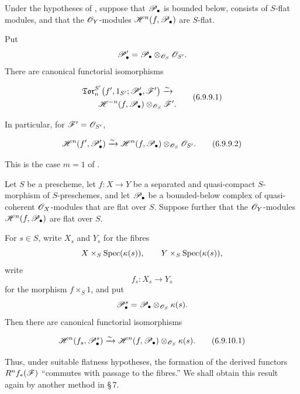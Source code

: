 \begin{corollary}[6.9.9]
\label{III.6.9.9}
Under the hypotheses of , suppose that
$\mathscr{P}_\bullet$ is bounded below, consists of $S$-flat modules,
and that the $\mathscr{O}_Y$-modules
$\mathscr{H}^n(f,\mathscr{P}_\bullet)$ are $S$-flat.


Put
\[
  \mathscr{P}_\bullet'
  =
  \mathscr{P}_\bullet\otimes_{\mathscr{O}_S}\mathscr{O}_{S'}.
\]
There are canonical functorial isomorphisms
\begin{env}[6.9.9.1]
\label{III.6.9.9.1}
\[
\begin{split}
  &
  \mathfrak{Tor}_n^{S'}
  \bigl(
    f',1_{S'};\mathscr{P}_\bullet',\mathscr{F}'
  \bigr)
  \xrightarrow{\sim}
  \\
  &\qquad
  \mathscr{H}^{-n}(f,\mathscr{P}_\bullet)
  \otimes_{\mathscr{O}_S}\mathscr{F}'.
\end{split}
  \tag{6.9.9.1}\label{III.6.9.9.1.eq}
\]
\end{env}
In particular, for $\mathscr{F}'=\mathscr{O}_{S'}$,
\begin{env}[6.9.9.2]
\label{III.6.9.9.2}
\[
  \mathscr{H}^n(f',\mathscr{P}_\bullet')
  \xrightarrow{\sim}
  \mathscr{H}^n(f,\mathscr{P}_\bullet)
  \otimes_{\mathscr{O}_S}\mathscr{O}_{S'}.
  \tag{6.9.9.2}\label{III.6.9.9.2.eq}
\]
\end{env}
This is the case $m=1$ of .
\end{corollary}

\begin{corollary}[6.9.10]
\label{III.6.9.10}
Let $S$ be a prescheme, let $f:X\to Y$ be a separated and
quasi-compact $S$-morphism of $S$-preschemes, and let
$\mathscr{P}_\bullet$ be a bounded-below complex of quasi-coherent
$\mathscr{O}_X$-modules that are flat over $S$.  Suppose further that
the $\mathscr{O}_Y$-modules $\mathscr{H}^n(f,\mathscr{P}_\bullet)$ are flat over
$S$.

For $s\in S$, write $X_s$ and $Y_s$ for the fibres
\[
  X\times_S\operatorname{Spec}(\kappa(s)),
  \qquad
  Y\times_S\operatorname{Spec}(\kappa(s)),
\]
write
\[
  f_s:X_s\longrightarrow Y_s
\]
for the morphism $f\times_S1$, and put
\[
  \mathscr{P}_\bullet^s
  =
  \mathscr{P}_\bullet\otimes_{\mathscr{O}_S}\kappa(s).
\]
Then there are canonical functorial isomorphisms
\begin{env}[6.9.10.1]
\label{III.6.9.10.1}
\[
  \mathscr{H}^n(f_s,\mathscr{P}_\bullet^s)
  \xrightarrow{\sim}
  \mathscr{H}^n(f,\mathscr{P}_\bullet)
  \otimes_{\mathscr{O}_S}\kappa(s).
  \tag{6.9.10.1}\label{III.6.9.10.1.eq}
\]
\end{env}
\end{corollary}

Thus, under suitable flatness hypotheses, the formation of the
derived functors $R^nf_*(\mathscr{F})$ ``commutes with passage to the
fibres.''  We shall obtain this result again by another method in
\S\,7.

